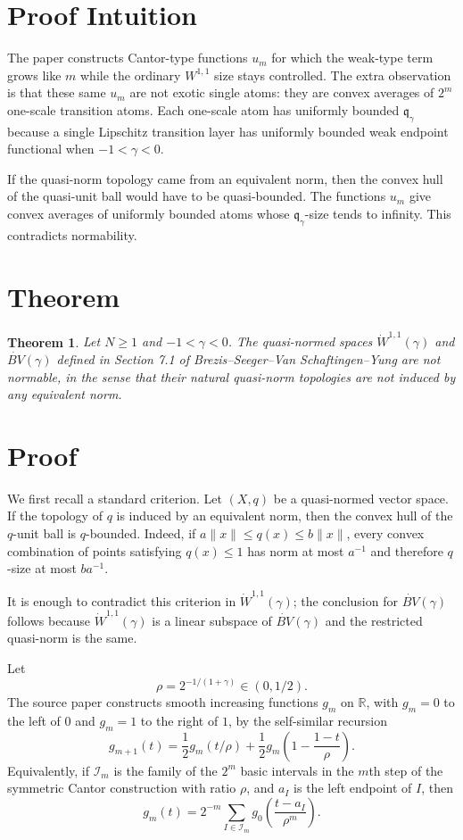 \documentclass[11pt]{article}
\newcommand{\R}{\mathbb R}
\newcommand{\BV}{\dot{BV}}
\newcommand{\Wone}{\dot W^{1,1}}
\newcommand{\qg}{\mathfrak q_\gamma}
\newtheorem{theorem}{Theorem}
\begin{document}
\section*{Proof Intuition}

The paper constructs Cantor-type functions $u_m$ for which the weak-type term grows like $m$ while the ordinary $W^{1,1}$ size stays controlled. The extra observation is that these same $u_m$ are not exotic single atoms: they are convex averages of $2^m$ one-scale transition atoms. Each one-scale atom has uniformly bounded $\qg$ because a single Lipschitz transition layer has uniformly bounded weak endpoint functional when $-1<\gamma<0$.

If the quasi-norm topology came from an equivalent norm, then the convex hull of the quasi-unit ball would have to be quasi-bounded. The functions $u_m$ give convex averages of uniformly bounded atoms whose $\qg$-size tends to infinity. This contradicts normability.

\section*{Theorem}

\begin{theorem}
Let $N\ge 1$ and $-1<\gamma<0$. The quasi-normed spaces $\Wone(\gamma)$ and $\BV(\gamma)$ defined in Section 7.1 of Brezis--Seeger--Van Schaftingen--Yung are not normable, in the sense that their natural quasi-norm topologies are not induced by any equivalent norm.
\end{theorem}

\section*{Proof}

We first recall a standard criterion. Let $(X,q)$ be a quasi-normed vector space. If the topology of $q$ is induced by an equivalent norm, then the convex hull of the $q$-unit ball is $q$-bounded. Indeed, if $a\|x\|\le q(x)\le b\|x\|$, every convex combination of points satisfying $q(x)\le1$ has norm at most $a^{-1}$ and therefore $q$-size at most $ba^{-1}$.

It is enough to contradict this criterion in $\Wone(\gamma)$; the conclusion for $\BV(\gamma)$ follows because $\Wone(\gamma)$ is a linear subspace of $\BV(\gamma)$ and the restricted quasi-norm is the same.

Let
\[
\rho=2^{-1/(1+\gamma)}\in(0,1/2).
\]
The source paper constructs smooth increasing functions $g_m$ on $\R$, with $g_m=0$ to the left of $0$ and $g_m=1$ to the right of $1$, by the self-similar recursion
\[
g_{m+1}(t)=\frac12 g_m(t/\rho)+\frac12 g_m\!\left(1-\frac{1-t}{\rho}\right).
\]
Equivalently, if $\mathcal I_m$ is the family of the $2^m$ basic intervals in the $m$th step of the symmetric Cantor construction with ratio $\rho$, and $a_I$ is the left endpoint of $I$, then
\[
g_m(t)=2^{-m}\sum_{I\in\mathcal I_m} g_0\!\left(\frac{t-a_I}{\rho^m}\right).
\]
\end{document}
